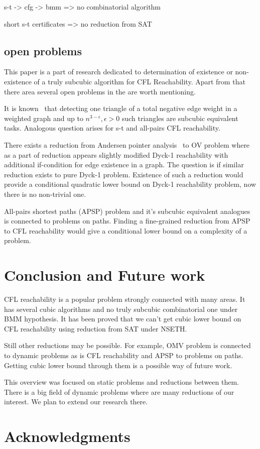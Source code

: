 \documentclass[acmsmall,review,nonacm]{acmart}\settopmatter{printfolios=true,printccs=false,printacmref=false}
\begin{document}
	s-t -> cfg -> bmm => no combinatorial algorithm
	
	short s-t certificates => no reduction from SAT
		
	\subsection{open problems}
	
	This paper is a part of research dedicated to determination of existence or non-existence of a truly subcubic algorithm for CFL Reachability. Apart from that there area several open problems in the are worth mentioning. 
	
	It is known~\cite{10.1145/3186893} that detecting one triangle of a total negative edge weight in a weighted graph and up to $n^{3 - \epsilon}, \epsilon > 0$ such triangles are subcubic equivalent tasks. Analogous question arises for s-t and all-pairs CFL reachability.
	
	 There exists a reduction from Andersen pointer analysis~\cite{10.1145/3434315} to OV problem where as a part of reduction appears slightly modified Dyck-1 reachability with additional if-condition for edge existence in a graph. The question is if similar reduction exists to pure Dyck-1 problem. Existence of such a reduction would provide a conditional quadratic lower bound on Dyck-1 reachability problem, now there is no non-trivial one.
	 
	 All-pairs shortest paths (APSP) problem and it's subcubic equivalent analogues~\cite{10.1145/3186893} is connected to problems on paths. Finding a fine-grained reduction from APSP to CFL reachability would give a conditional lower bound on a complexity of a problem.
	
	\section{Conclusion and Future work}
	
	CFL reachability is a popular problem strongly connected with many areas. It has several cubic algorithms and no truly subcubic combinatorial one under BMM hypothesis. It has been proved that we can't get cubic lower bound on CFL reachability using reduction from SAT under NSETH. 
	
	Still other reductions may be possible. For example, OMV problem is connected to dynamic problems as is CFL reachability and APSP to problems on paths. Getting cubic lower bound through them is a possible way of future work. 
	
	This overview was focused on static problems and reductions between them. There is a big field of dynamic problems where are many reductions of our interest. We plan to extend our research there. 
	
	\section{Acknowledgments}
	
	
	
	
	\appendix
	
\end{document}
